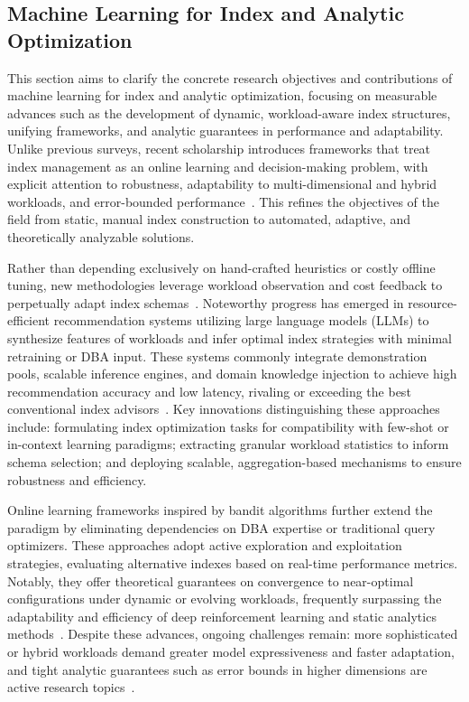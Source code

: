 \documentclass[sigconf]{acmart}
\begin{document}
\subsection{Machine Learning for Index and Analytic Optimization}

This section aims to clarify the concrete research objectives and contributions of machine learning for index and analytic optimization, focusing on measurable advances such as the development of dynamic, workload-aware index structures, unifying frameworks, and analytic guarantees in performance and adaptability. Unlike previous surveys, recent scholarship introduces frameworks that treat index management as an online learning and decision-making problem, with explicit attention to robustness, adaptability to multi-dimensional and hybrid workloads, and error-bounded performance~\cite{ref110,ref111}. This refines the objectives of the field from static, manual index construction to automated, adaptive, and theoretically analyzable solutions.

Rather than depending exclusively on hand-crafted heuristics or costly offline tuning, new methodologies leverage workload observation and cost feedback to perpetually adapt index schemas~\cite{ref110,ref111}. Noteworthy progress has emerged in resource-efficient recommendation systems utilizing large language models (LLMs) to synthesize features of workloads and infer optimal index strategies with minimal retraining or DBA input. These systems commonly integrate demonstration pools, scalable inference engines, and domain knowledge injection to achieve high recommendation accuracy and low latency, rivaling or exceeding the best conventional index advisors~\cite{ref110,ref115}. Key innovations distinguishing these approaches include: formulating index optimization tasks for compatibility with few-shot or in-context learning paradigms; extracting granular workload statistics to inform schema selection; and deploying scalable, aggregation-based mechanisms to ensure robustness and efficiency.

Online learning frameworks inspired by bandit algorithms further extend the paradigm by eliminating dependencies on DBA expertise or traditional query optimizers. These approaches adopt active exploration and exploitation strategies, evaluating alternative indexes based on real-time performance metrics. Notably, they offer theoretical guarantees on convergence to near-optimal configurations under dynamic or evolving workloads, frequently surpassing the adaptability and efficiency of deep reinforcement learning and static analytics methods~\cite{ref110}. Despite these advances, ongoing challenges remain: more sophisticated or hybrid workloads demand greater model expressiveness and faster adaptation, and tight analytic guarantees such as error bounds in higher dimensions are active research topics~\cite{ref110,ref115}.
\end{document}
